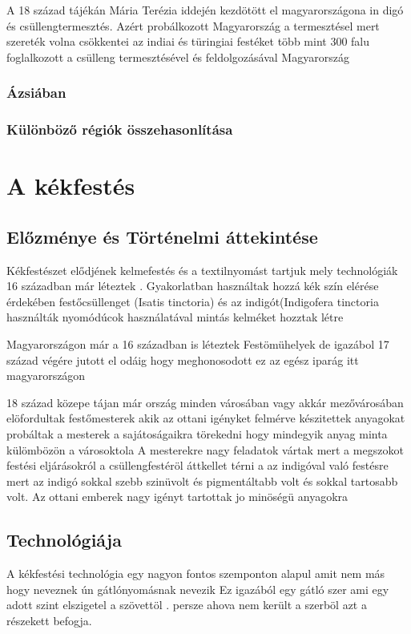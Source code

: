 \documentclass[fontsize=12pt, appendixprefix=true]{scrreprt}
\begin{document}
A 18 század tájékán Mária Terézia iddején kezdötött el magyarországona in digó és csüllengtermesztés.
Azért probálkozott Magyarország a termesztésel mert szereték volna csökkentei az indiai és türingiai festéket
több mint 300 falu foglalkozott a csülleng termesztésével  és feldolgozásával 
Magyarország 

\subsection{Ázsiában}
\subsection{Különböző régiók összehasonlítása}

\chapter{A kékfestés}
\section{Előzménye és Történelmi áttekintése}
Kékfestészet elődjének kelmefestés és a textilnyomást tartjuk mely technológiák 16 században már  léteztek .
Gyakorlatban használtak hozzá kék szín elérése érdekében festőcsüllenget (Isatis tinctoria) és az indigót(Indigofera tinctoria használták nyomódúcok használatával mintás kelméket hozztak létre 

Magyarországon már a 16 században is léteztek Festömühelyek de igazábol 17 század végére jutott el odáig hogy meghonosodott ez az egész iparág itt magyarországon 

18 század közepe tájan már ország minden  városában vagy akkár mezővárosában elöfordultak festőmesterek akik az ottani igényket felmérve készitettek  anyagokat probáltak a mesterek a sajátoságaikra törekedni hogy mindegyik anyag minta külömbözön a városoktola 
A mesterekre nagy feladatok vártak mert a megszokot festési eljárásokról a csüllengfestéröl áttkellet térni a az indigóval való festésre mert az indigó sokkal szebb szinüvolt és pigmentáltabb volt és sokkal tartosabb volt.
Az ottani emberek nagy igényt tartottak jo minöségü anyagokra 


\section{Technológiája}
A kékfestési technológia egy nagyon fontos szemponton alapul amit nem más hogy neveznek  ún gátlónyomásnak nevezik
Ez igazából egy gátló szer ami egy adott szint elszigetel a szövettöl .
persze ahova nem került a szerböl azt a részekett befogja. 
\end{document}
